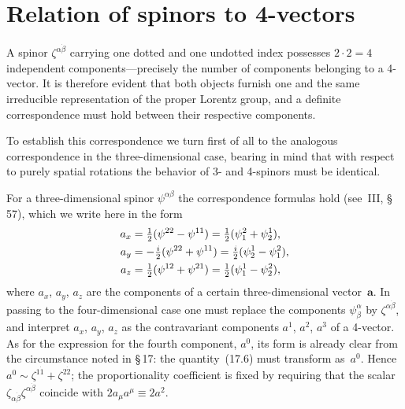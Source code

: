 \section{Relation of spinors to 4-vectors}

A spinor $\zeta^{\alpha\dot\beta}$ carrying one dotted and one undotted index possesses $2\cdot 2 = 4$ independent components---precisely the number of components belonging to a 4-vector. It is therefore evident that both objects furnish one and the same irreducible representation of the proper Lorentz group, and a definite correspondence must hold between their respective components.

To establish this correspondence we turn first of all to the analogous correspondence in the three-dimensional case, bearing in mind that with respect to purely spatial rotations the behavior of 3- and 4-spinors must be identical.

For a three-dimensional spinor $\psi^{\alpha\beta}$ the correspondence formulas hold (see~III, \S\,57), which we write here in the form
\begin{align}
a_x &= \tfrac{1}{2}(\psi^{22} - \psi^{11}) = \tfrac{1}{2}(\psi^2_1 + \psi^1_2), \notag\\
a_y &= -\tfrac{i}{2}(\psi^{22} + \psi^{11}) = \tfrac{i}{2}(\psi^1_2 - \psi^2_1), \notag\\
a_z &= \tfrac{1}{2}(\psi^{12} + \psi^{21}) = \tfrac{1}{2}(\psi^1_1 - \psi^2_2),
\end{align}
where $a_x$, $a_y$, $a_z$ are the components of a certain three-dimensional vector~$\mathbf{a}$. In passing to the four-dimensional case one must replace the components $\psi^\alpha_\beta$ by $\zeta^{\alpha\dot\beta}$, and interpret $a_x$, $a_y$, $a_z$ as the contravariant components $a^1$, $a^2$, $a^3$ of a 4-vector. As for the expression for the fourth component, $a^0$, its form is already clear from the
circumstance noted in \S\,17: the quantity~(17.6) must transform as~$a^0$. Hence $a^0 \sim \zeta^{1\dot 1} + \zeta^{2\dot 2}$; the proportionality coefficient is fixed by requiring that the scalar $\zeta_{\alpha\dot\beta}\zeta^{\alpha\dot\beta}$ coincide with $2a_\mu a^\mu \equiv 2a^2$.

